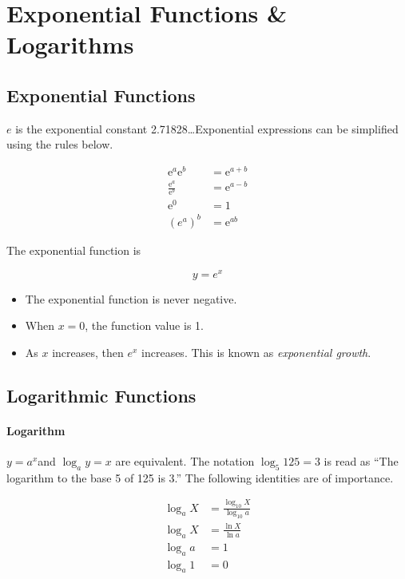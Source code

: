 \section{Exponential Functions \& Logarithms}

\subsection{Exponential Functions}
\(e\) is the exponential constant 2.71828\ldots Exponential expressions can be simplified using the rules below.

\begin{align}
	\mathrm{e}^{a} \mathrm{e}^{b}         & =\mathrm{e}^{a+b} \\[20pt]
	\frac{\mathrm{e}^{a}}{\mathrm{e}^{b}} & =\mathrm{e}^{a-b} \\[20pt]
	\mathrm{e}^{0}                        & =1                \\[20pt]
	{(e^a)}^{b}                           & =\mathrm{e}^{a b}
\end{align}

The exponential function is

\begin{equation}
	y = e^x
\end{equation}

\begin{itemize}
	\item The exponential function is never negative.
	\item When \(x = 0\), the function value is 1.
	\item As \(x\) increases, then \(e^x\) increases. This is known as \emph{exponential growth}.
\end{itemize}

\subsection{Logarithmic Functions}

\paragraph{Logarithm}
\(y = a^x \)and \(\log_{a} y = x\) are equivalent. The notation \(\log_{5} 125 = 3\) is read as ``The logarithm to the base 5 of 125 is 3.'' The following identities are of importance.

\begin{align}
	\log_a X & = \frac{\log_{10} X}{\log_{10} a} \\[20pt]
	\log_a X & = \frac{\ln X}{\ln a}             \\[20pt]
	\log_a a & = 1                               \\[20pt]
	\log_a 1 & = 0
\end{align}
